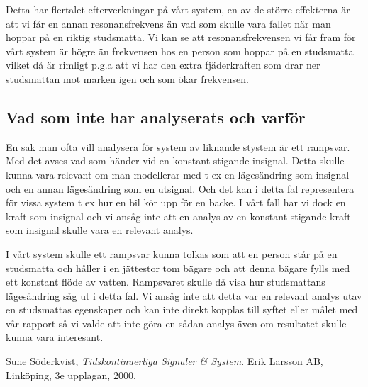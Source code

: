 \documentclass[10pt,a4paper]{article}
\begin{document}
Detta har flertalet efterverkningar på vårt system, en av de större effekterna är att vi får en annan resonansfrekvens än vad som skulle vara fallet när man hoppar på en riktig studsmatta. Vi kan se att resonansfrekvensen vi får fram för vårt system är högre än frekvensen hos en person som hoppar på en studsmatta vilket då är rimligt p.g.a att vi har den extra fjäderkraften som drar ner studsmattan mot marken igen och som ökar frekvensen.

\subsection{Vad som inte har analyserats och varför}

En sak man ofta vill analysera för system av liknande stystem är ett rampsvar. Med det avses vad som händer vid en konstant stigande insignal. Detta skulle kunna vara relevant om man modellerar med t ex en lägesändring som insignal och en annan lägesändring som en utsignal. Och det kan i detta fal representera för vissa system t ex hur en bil kör upp för en backe. I vårt fall har vi dock en kraft som insignal och vi ansåg inte att en analys av en konstant stigande kraft som insignal skulle vara en relevant analys.

I vårt system skulle ett rampsvar kunna tolkas som att en person står på en studsmatta och håller i en jättestor tom bägare och att denna bägare fylls med ett konstant flöde av vatten. Rampsvaret skulle då visa hur studsmattans lägesändring såg ut i detta fal. Vi ansåg inte att detta var en relevant analys utav en studsmattas egenskaper och kan inte direkt kopplas till syftet eller målet med vår rapport så vi valde att inte göra en sådan analys även om resultatet skulle kunna vara interesant.




\newpage

\begin{thebibliography}{9}

  Sune Söderkvist,
  \emph{Tidskontinuerliga Signaler \& System}.
  \linebreak
  Erik Larsson AB, Linköping,
  3e upplagan,
  2000.

\end{thebibliography}
\end{document}
